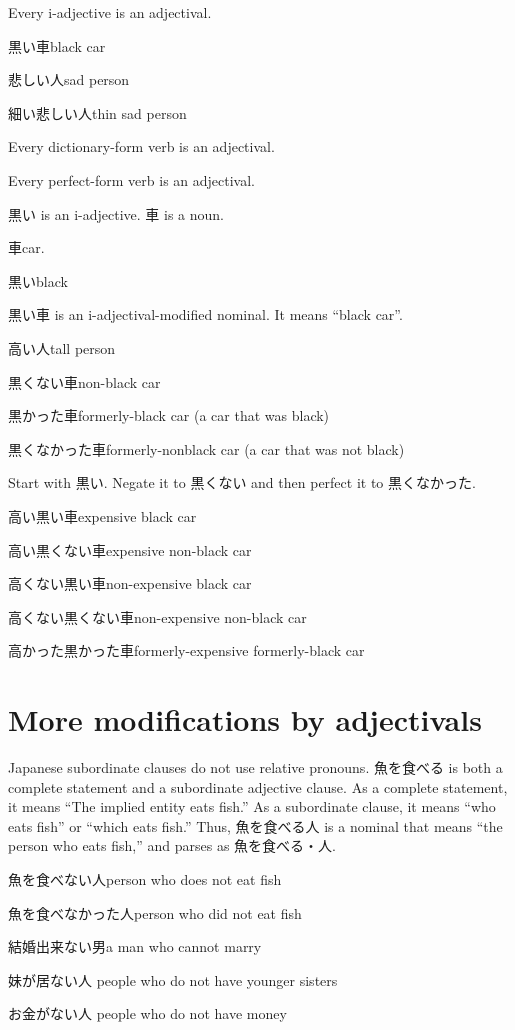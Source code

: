 Every i-adjective is an adjectival.

黒い車black car

悲しい人sad person

細い悲しい人thin sad person

Every dictionary-form verb is an adjectival.

Every perfect-form verb is an adjectival.

黒い is an i-adjective.
車 is a noun.

車car.

黒いblack

黒い車 is an i-adjectival-modified nominal. It means ``black car''.

高い人tall person

黒くない車non-black car

黒かった車formerly-black car (a car that was black)

黒くなかった車formerly-nonblack car (a car that was not black)

Start with 黒い. Negate it to 黒くない
and then perfect it to 黒くなかった.

高い黒い車expensive black car

高い黒くない車expensive non-black car

高くない黒い車non-expensive black car

高くない黒くない車non-expensive non-black car

高かった黒かった車formerly-expensive formerly-black car

\section{More modifications by adjectivals}

Japanese subordinate clauses do not use relative pronouns.
魚を食べる is both a complete statement and a subordinate adjective clause.
As a complete statement, it means ``The implied entity eats fish.''
As a subordinate clause, it means ``who eats fish'' or ``which eats fish.''
Thus, 魚を食べる人 is a nominal that means ``the person who eats fish,''
and parses as 魚を食べる・人.

魚を食べない人person who does not eat fish

魚を食べなかった人person who did not eat fish

結婚出来ない男a man who cannot marry

妹が居ない人
people who do not have younger sisters

お金がない人
people who do not have money

